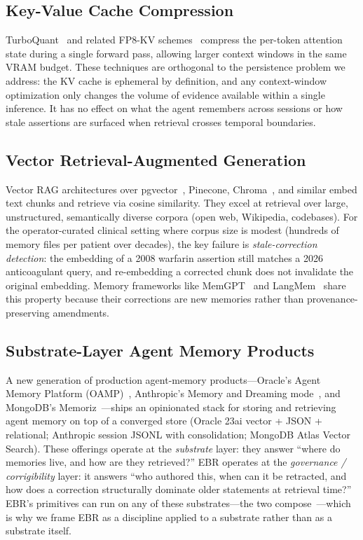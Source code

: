 \documentclass[runningheads]{llncs}
\begin{document}
\subsection{Key-Value Cache Compression}

TurboQuant~\cite{turboquant2026} and related FP8-KV
schemes~\cite{fp8kv2024,sparseattention2025} compress the per-token attention
state during a single forward pass, allowing larger context windows in the
same VRAM budget. These techniques are orthogonal to the persistence problem
we address: the KV cache is ephemeral by definition, and any context-window
optimization only changes the volume of evidence available within a single
inference. It has no effect on what the agent remembers across sessions or
how stale assertions are surfaced when retrieval crosses temporal boundaries.

\subsection{Vector Retrieval-Augmented Generation}

Vector RAG architectures over pgvector~\cite{pgvector}, Pinecone,
Chroma~\cite{chroma}, and similar embed text chunks and retrieve via cosine
similarity. They excel at retrieval over large, unstructured, semantically
diverse corpora (open web, Wikipedia, codebases). For the operator-curated
clinical setting where corpus size is modest (hundreds of memory files per
patient over decades), the key failure is \emph{stale-correction detection}:
the embedding of a 2008 warfarin assertion still matches a 2026 anticoagulant
query, and re-embedding a corrected chunk does not invalidate the original
embedding. Memory frameworks like MemGPT~\cite{memgpt2023} and
LangMem~\cite{langmem2024} share this property because their corrections are
new memories rather than provenance-preserving amendments.

\subsection{Substrate-Layer Agent Memory Products}
\label{sec:related-substrates}

A new generation of production agent-memory products---Oracle's Agent Memory
Platform (OAMP)~\cite{oracleOAMP2026}, Anthropic's Memory and Dreaming
mode~\cite{anthropicMemoryDreaming2026}, and MongoDB's
Memoriz~\cite{mongoMemoriz2026}---ships an opinionated stack for storing and
retrieving agent memory on top of a converged store (Oracle 23ai vector +
JSON + relational; Anthropic session JSONL with consolidation;
MongoDB Atlas Vector Search). These offerings operate at the
\emph{substrate} layer: they answer ``where do memories live, and how are
they retrieved?'' EBR operates at the \emph{governance / corrigibility}
layer: it answers ``who authored this, when can it be retracted, and how
does a correction structurally dominate older statements at retrieval
time?'' EBR's primitives can run on any of these substrates---the two
compose~\cite{oracleAgentMemoryBenchmarks2026}---which is why we frame EBR
as a discipline applied to a substrate rather than as a substrate itself.
\end{document}
